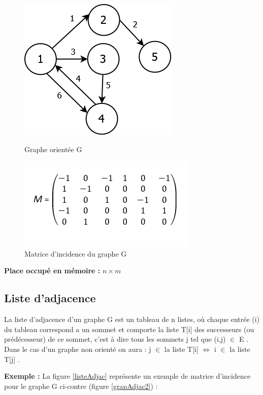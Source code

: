 \begin{figure}[H]
	\begin{minipage}[c]{.46\linewidth}
	\begin{center}
		\includegraphics[height=100 pt, width=110 pt]{./ressources/image/graphIncid.png} 
		\caption{Graphe orientée G}
		\label{grapIncid}
	\end{center}
	\end{minipage} 
	\begin{minipage}[c]{.46\linewidth}
	\begin{center}
		\includegraphics[height=110 pt, width=140 pt]{./ressources/image/matriceIncid.png} 
		\caption{Matrice d'incidence du graphe G}
		\label{matriceIncid}
	\end{center}
	\end{minipage} 
\end{figure}

\textbf{Place occupé en mémoire :} $n \times m$
		
		\subsection{Liste d'adjacence}
			La liste d'adjacence d'un graphe G est un tableau de n listes, où chaque entrée (i) du tableau correspond a un sommet et comporte la liste T[i] des successeurs (ou prédécesseur) de ce sommet, c'est à dire tous les sommets j tel que (i,j) $\in$ E \citep{mathieu}.\\
Dans le cas d'un graphe non orienté on aura : j $\in$ la liste T[i]  $\iff$ i $\in$ la liste T[j] \citep{IUTLyonInformatique}.

\textbf{Exemple :} La figure \ref{listeAdjac} représente 					un exemple de matrice d'incidence pour le graphe G ci-contre 			(figure \ref{grapAdjac2}) :
			
